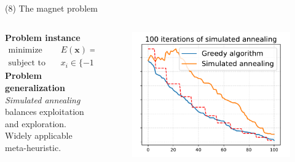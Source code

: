 \documentclass[11pt, aspectratio=149]{beamer}
\theoremstyle{plain}
\begin{document}
\begin{frame}[fragile, t]{(8) The magnet problem}
	\begin{columns}
		\begin{column}{0.55\textwidth}
			\textbf{Problem instance}
			\begin{align*}
			\text{minimize } \quad & E(\mathbf{x}) = \mathbf{x}^T \mathbf{W} \mathbf{x}  \\
			\text{subject to } \quad & x_i \in \{-1, 1\}  .
			\end{align*}
			\textbf{Problem generalization}
			\\
			\vspace*{0.5em} 
			\emph{Simulated annealing} balances exploitation and exploration. \\
			Widely applicable meta-heuristic.
		\end{column}
		\begin{column}{0.45\textwidth}%
	\begin{figure}
		\centering
		\includegraphics[width=1.1\linewidth]{figs/simulated_annealing.pdf} %
	\end{figure}
		\end{column}
	\end{columns}
\end{frame}

\end{document}
